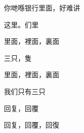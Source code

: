 \documentclass{article}
\newcommand\macro{们里}
\begin{document}
\begin{jyutpingscope}
你哋喺银行里面，好难讲
\end{jyutpingscope}

\begin{jyutpingscope}[auto]
这里。\macro
\end{jyutpingscope}

\begin{jyutpingscope}[simplified]
里面，裡面，裏面

三只，隻
\end{jyutpingscope}

\begin{jyutpingscope}[traditional]
里面，裡面，裏面

我们只有三只

回复，回覆
\end{jyutpingscope}

\begin{jyutpingscope}[simplified]
回复，回覆，回復
\end{jyutpingscope}
\end{document}
